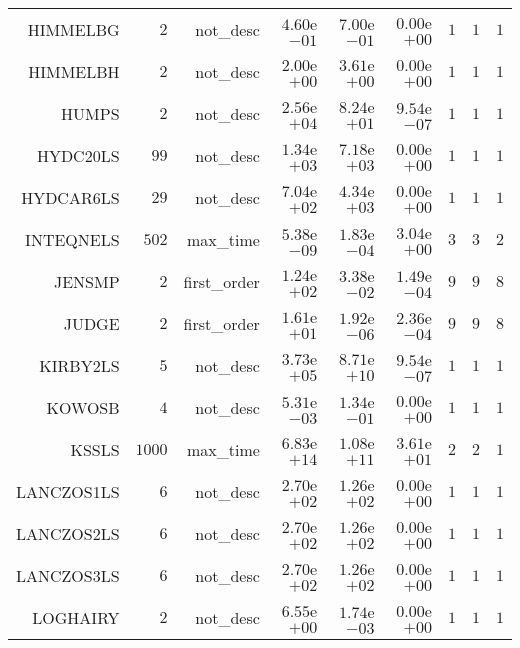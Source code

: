 \begin{longtable}{rrrrrrrrr}
HIMMELBG & \(     2\) & not\_desc & \( 4.60\)e\(-01\) & \( 7.00\)e\(-01\) & \( 0.00\)e\(+00\) & \(     1\) & \(     1\) & \(     1\) \\
HIMMELBH & \(     2\) & not\_desc & \( 2.00\)e\(+00\) & \( 3.61\)e\(+00\) & \( 0.00\)e\(+00\) & \(     1\) & \(     1\) & \(     1\) \\
HUMPS & \(     2\) & not\_desc & \( 2.56\)e\(+04\) & \( 8.24\)e\(+01\) & \( 9.54\)e\(-07\) & \(     1\) & \(     1\) & \(     1\) \\
HYDC20LS & \(    99\) & not\_desc & \( 1.34\)e\(+03\) & \( 7.18\)e\(+03\) & \( 0.00\)e\(+00\) & \(     1\) & \(     1\) & \(     1\) \\
HYDCAR6LS & \(    29\) & not\_desc & \( 7.04\)e\(+02\) & \( 4.34\)e\(+03\) & \( 0.00\)e\(+00\) & \(     1\) & \(     1\) & \(     1\) \\
INTEQNELS & \(   502\) & max\_time & \( 5.38\)e\(-09\) & \( 1.83\)e\(-04\) & \( 3.04\)e\(+00\) & \(     3\) & \(     3\) & \(     2\) \\
JENSMP & \(     2\) & first\_order & \( 1.24\)e\(+02\) & \( 3.38\)e\(-02\) & \( 1.49\)e\(-04\) & \(     9\) & \(     9\) & \(     8\) \\
JUDGE & \(     2\) & first\_order & \( 1.61\)e\(+01\) & \( 1.92\)e\(-06\) & \( 2.36\)e\(-04\) & \(     9\) & \(     9\) & \(     8\) \\
KIRBY2LS & \(     5\) & not\_desc & \( 3.73\)e\(+05\) & \( 8.71\)e\(+10\) & \( 9.54\)e\(-07\) & \(     1\) & \(     1\) & \(     1\) \\
KOWOSB & \(     4\) & not\_desc & \( 5.31\)e\(-03\) & \( 1.34\)e\(-01\) & \( 0.00\)e\(+00\) & \(     1\) & \(     1\) & \(     1\) \\
KSSLS & \(  1000\) & max\_time & \( 6.83\)e\(+14\) & \( 1.08\)e\(+11\) & \( 3.61\)e\(+01\) & \(     2\) & \(     2\) & \(     1\) \\
LANCZOS1LS & \(     6\) & not\_desc & \( 2.70\)e\(+02\) & \( 1.26\)e\(+02\) & \( 0.00\)e\(+00\) & \(     1\) & \(     1\) & \(     1\) \\
LANCZOS2LS & \(     6\) & not\_desc & \( 2.70\)e\(+02\) & \( 1.26\)e\(+02\) & \( 0.00\)e\(+00\) & \(     1\) & \(     1\) & \(     1\) \\
LANCZOS3LS & \(     6\) & not\_desc & \( 2.70\)e\(+02\) & \( 1.26\)e\(+02\) & \( 0.00\)e\(+00\) & \(     1\) & \(     1\) & \(     1\) \\
LOGHAIRY & \(     2\) & not\_desc & \( 6.55\)e\(+00\) & \( 1.74\)e\(-03\) & \( 0.00\)e\(+00\) & \(     1\) & \(     1\) & \(     1\) \\

\end{longtable}
